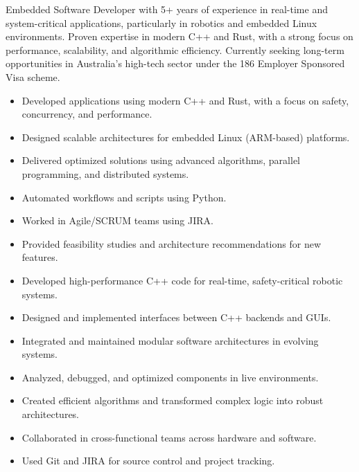 \documentclass[10pt,a4paper,ragged2e,withhyper]{altacv}
\begin{document}
\begin{paracol}{2}


	Embedded Software Developer with 5+ years of experience in real-time and system-critical applications,
	particularly in robotics and embedded Linux environments. Proven expertise in modern C++ and Rust, with a
	strong focus on performance, scalability, and algorithmic efficiency. Currently seeking long-term opportunities
	in Australia’s high-tech sector under the 186 Employer Sponsored Visa scheme.	


	\begin{itemize}
		\item Developed applications using modern C++ and Rust, with a focus on safety, concurrency, and performance.
		\item Designed scalable architectures for embedded Linux (ARM-based) platforms.
		\item Delivered optimized solutions using advanced algorithms, parallel programming, and distributed systems.
		\item Automated workflows and scripts using Python.
		\item Worked in Agile/SCRUM teams using JIRA.
		\item Provided feasibility studies and architecture recommendations for new features.
	\end{itemize}

	\divider

	\begin{itemize}
		\item Developed high-performance C++ code for real-time, safety-critical robotic systems.
		\item Designed and implemented interfaces between C++ backends and GUIs.
		\item Integrated and maintained modular software architectures in evolving systems.
		\item Analyzed, debugged, and optimized components in live environments.
		\item Created efficient algorithms and transformed complex logic into robust architectures.
		\item Collaborated in cross-functional teams across hardware and software.
		\item Used Git and JIRA for source control and project tracking.
	\end{itemize}


\end{paracol}
\end{document}
